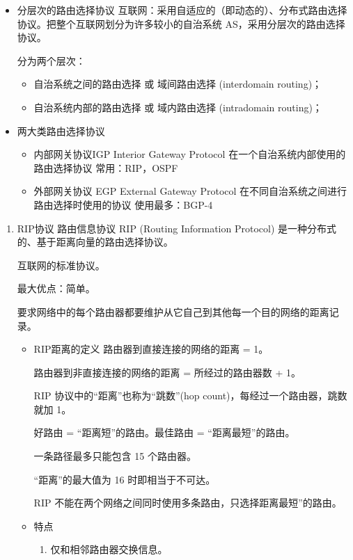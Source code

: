 \documentclass[11pt]{article}
\begin{document}
\begin{enumerate}
\begin{itemize}
\item 分层次的路由选择协议
互联网：采用自适应的（即动态的）、分布式路由选择协议。把整个互联网划分为许多较小的自治系统 AS，采用分层次的路由选择协议。

分为两个层次：
\begin{itemize}
\item 自治系统之间的路由选择 或 域间路由选择 (interdomain routing)；

\item 自治系统内部的路由选择 或 域内路由选择 (intradomain routing)；
\end{itemize}

\item 两大类路由选择协议
\begin{itemize}
\item 内部网关协议IGP
Interior Gateway Protocol
在一个自治系统内部使用的路由选择协议
常用：RIP，OSPF
\item 外部网关协议 EGP
External Gateway Protocol
在不同自治系统之间进行路由选择时使用的协议
使用最多：BGP-4
\end{itemize}
\end{itemize}

\begin{enumerate}
\item RIP协议
\label{sec:org2fcffb6}
路由信息协议 RIP (Routing Information Protocol) 是一种分布式的、基于距离向量的路由选择协议。

互联网的标准协议。

最大优点：简单。

要求网络中的每个路由器都要维护从它自己到其他每一个目的网络的距离记录。 

\begin{itemize}
\item RIP距离的定义
路由器到直接连接的网络的距离 = 1。

路由器到非直接连接的网络的距离 = 所经过的路由器数 + 1。

RIP 协议中的“距离”也称为“跳数”(hop count)，每经过一个路由器，跳数就加 1。

好路由 = “距离短”的路由。最佳路由 = “距离最短”的路由。

一条路径最多只能包含 15 个路由器。

“距离”的最大值为 16 时即相当于不可达。

RIP 不能在两个网络之间同时使用多条路由，只选择距离最短”的路由。
\item 特点
\begin{enumerate}
\item 仅和相邻路由器交换信息。


\end{enumerate}
\end{itemize}
\end{enumerate}
\end{enumerate}
\end{document}
